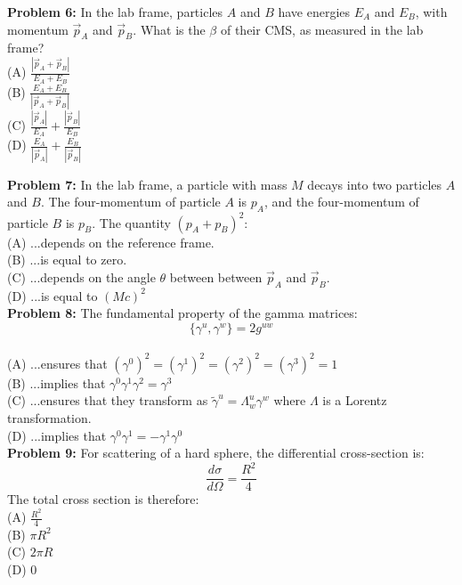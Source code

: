 \documentclass[12pt]{article}
\begin{document}
\noindent
{\bf Problem 6:} In the lab frame, particles $A$ and $B$ have energies $E_A$ and $E_B$, with momentum $\vec{p}_A$ and $\vec{p}_B$.  What is the $\beta$ of their CMS, as measured in the lab frame?\\[5pt]
(A) $\displaystyle \frac{|\vec{p}_A + \vec{p}_B|}{E_A + E_B}$\\[6pt]
(B) $\displaystyle \frac{E_A + E_B}{|\vec{p}_A + \vec{p}_B|}$\\[6pt]
(C) $\displaystyle \frac{|\vec{p}_A|}{E_A}+\frac{|\vec{p}_B|}{E_B}$\\[6pt]
(D) $\displaystyle \frac{E_A}{|\vec{p}_A|}+\frac{E_B}{|\vec{p}_B|}$\\[10pt]

\newpage

\noindent
{\bf Problem 7:} In the lab frame, a particle with mass $M$ decays into two particles $A$ and $B$.  The four-momentum of particle $A$ is $p_A$, and the four-momentum of particle $B$ is $p_B$.  The quantity $(p_A + p_B)^2$:\\[5pt]
(A) ...depends on the reference frame.\\[5pt]
(B) ...is equal to zero.\\[5pt]
(C) ...depends on the angle $\theta$ between between $\vec{p}_A$ and $\vec{p}_B$.\\[5pt]
(D) ...is equal to $(Mc)^2$\\[10pt]

\noindent
{\bf Problem 8:} The fundamental property of the gamma matrices:\\[5pt]
$$\{ \gamma^u, \gamma^w\} = 2 g^{uw}$$\\[5pt]
(A) ...ensures that $(\gamma^0)^2 = (\gamma^1)^2 = (\gamma^2)^2 = (\gamma^3)^2 = 1$\\[5pt]
(B) ...implies that $\gamma^0\gamma^1\gamma^2 = \gamma^3$\\[5pt]
(C) ...ensures that they transform as $\widetilde{\gamma}^u = \Lambda^u_w \gamma^w$ where $\Lambda$ is a Lorentz transformation.\\[5pt]
(D) ...implies that $\gamma^0\gamma^1 = -\gamma^1\gamma^0$\\[10pt]

\noindent
{\bf Problem 9:} For scattering of a hard sphere, the differential cross-section is:
$$\frac{d\sigma}{d\Omega} = \frac{R^2}{4}$$
The total cross section is therefore:\\[8pt]
(A) $\displaystyle \frac{R^2}{4}$\\[6pt]
(B) $\pi R^2$\\[5pt]
(C) $2\pi R$\\[5pt]
(D) $0$\\[10pt]
\end{document}
